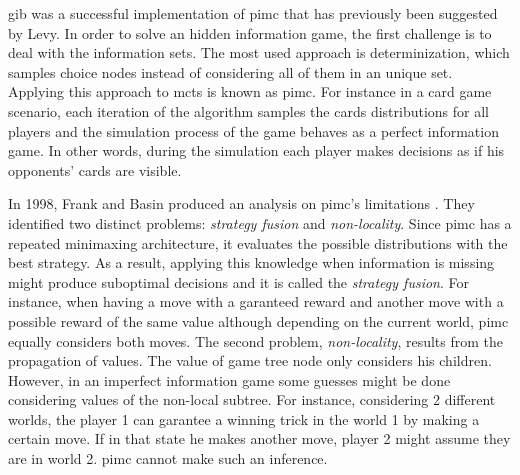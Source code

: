 \gls{gib} was a successful implementation of \gls{pimc} that has previously been suggested by Levy.
In order to solve an hidden information game, the first challenge is to deal with the information sets.
The most used approach is determinization, which samples choice nodes instead of considering all of them in an unique set.
Applying this approach to \gls{mcts} is known as \gls{pimc}.
For instance in a card game scenario, each iteration of the algorithm samples the cards distributions for all players and the simulation process of the game behaves as a perfect information game.
In other words, during the simulation each player makes decisions as if his opponents' cards are visible.


In 1998, Frank and Basin produced an analysis on \gls{pimc}'s limitations \cite{Frank1998}.
They identified two distinct problems: \emph{strategy fusion} and \emph{non-locality}.
Since \gls{pimc} has a repeated minimaxing architecture, it evaluates the possible distributions with the best strategy.
As a result, applying this knowledge when information is missing might produce suboptimal decisions and it is called the \emph{strategy fusion}.
For instance, when having a move with a garanteed reward and another move with a possible reward of the same value although depending on the current world, \gls{pimc} equally considers both moves.
The second problem, \emph{non-locality}, results from the propagation of values.
The value of game tree node only considers his children.
However, in an imperfect information game some guesses might be done considering values of the non-local subtree.
For instance, considering 2 different worlds, the player 1 can garantee a winning trick in the world 1 by making a certain move.
If in that state he makes another move, player 2 might assume they are in world 2.
\gls{pimc} cannot make such an inference.



